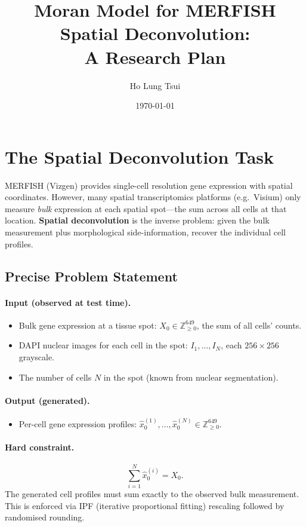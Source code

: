 \documentclass[11pt]{article}
\title{Moran Model for MERFISH Spatial Deconvolution:\\A Research Plan}
\author{Ho Lung Tsui}
\date{\today}
\begin{document}
\maketitle

\section{The Spatial Deconvolution Task}

MERFISH (Vizgen) provides single-cell resolution gene expression with spatial coordinates. However, many spatial transcriptomics platforms (e.g.\ Visium) only measure \emph{bulk} expression at each spatial spot---the sum across all cells at that location. \textbf{Spatial deconvolution} is the inverse problem: given the bulk measurement plus morphological side-information, recover the individual cell profiles.

\subsection{Precise Problem Statement}

\paragraph{Input (observed at test time).}
\begin{itemize}
  \item Bulk gene expression at a tissue spot: $X_0 \in \mathbb{Z}_{\geq 0}^{649}$, the sum of all cells' counts.
  \item DAPI nuclear images for each cell in the spot: $I_1, \ldots, I_N$, each $256 \times 256$ grayscale.
  \item The number of cells $N$ in the spot (known from nuclear segmentation).
\end{itemize}

\paragraph{Output (generated).}
\begin{itemize}
  \item Per-cell gene expression profiles: $\hat{x}_0^{(1)}, \ldots, \hat{x}_0^{(N)} \in \mathbb{Z}_{\geq 0}^{649}$.
\end{itemize}

\paragraph{Hard constraint.}
\[
  \sum_{i=1}^N \hat{x}_0^{(i)} = X_0.
\]
The generated cell profiles must sum exactly to the observed bulk measurement. This is enforced via IPF (iterative proportional fitting) rescaling followed by randomised rounding.
\end{document}

